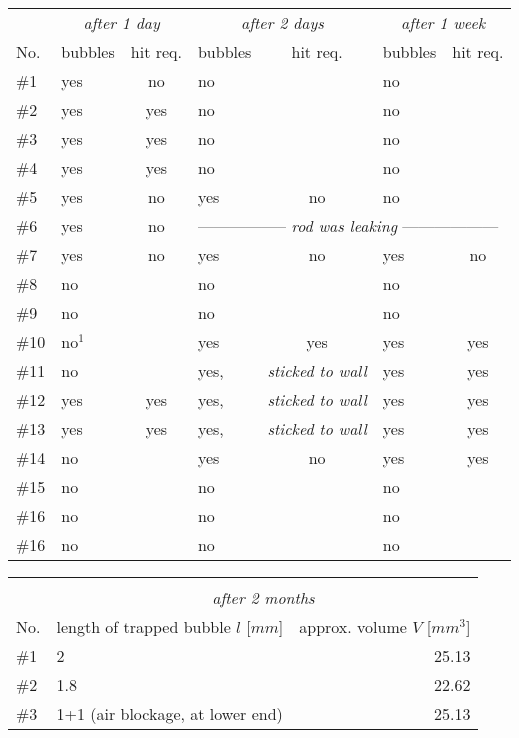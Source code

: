 \begin{table}[]
\centering
\begin{tabular}{l|lc|lc|lc}
    & \multicolumn{2}{c}{\textit{after 1 day}} 	& \multicolumn{2}{c}{\textit{after 2 days}}	& \multicolumn{2}{c}{\textit{after 1 week}}	\\ 
No. & bubbles	& hit req.	& bubbles 	& hit req.	& bubbles 	& hit req.	\\
\toprule
\#1   & yes	& no		& no		&		& no		&		\\
\#2   & yes	& yes		& no		&		& no		&		\\
\#3   & yes	& yes		& no		&		& no		&		\\
\#4   & yes	& yes		& no		&		& no		&		\\
\#5   & yes	& no		& yes		& no		& no		&		\\
\#6   & yes	& no		& \multicolumn{4}{l}{-----------------\textit{ rod was leaking }------------------}	\\
\#7   & yes	& no		& yes		& no		& yes		& no		\\
\#8   & no	&		& no		&		& no		&		\\
\#9   & no	&		& no		&		& no		&		\\
\#10  & no$^1$	&		& yes		& yes		& yes		& yes		\\
\#11  & no	&		& yes,		& \textit{sticked to wall} &	 yes	& yes\\
\#12  & yes	& yes		& yes,		& \textit{sticked to wall} &	 yes	& yes\\
\#13  & yes	& yes		& yes,		& \textit{sticked to wall} &	 yes	& yes\\
\#14  & no	&   		& yes		& no		& yes		& yes		\\
\#15  & no	&   		& no		&		& no		&		\\
\#16  & no	&   		& no		&		& no		&		\\
\#16  & no	&   		& no		&		& no		&		\\
\bottomrule
\end{tabular}
\begin{tabular}{l|lr}
\multicolumn{3}{c}{}								\\
& \multicolumn{2}{c}{\textit{after 2 months}}					\\ 
No. & length of trapped bubble $l$ [$mm$] 	& approx. volume $V$ [$mm^3$]	\\
\toprule
\#1   & 2					& 25.13				\\
\#2   & 1.8					& 22.62				\\
\#3   & 1+1 (air blockage, at lower end)	& 25.13				\\

\end{tabular}
\end{table}
